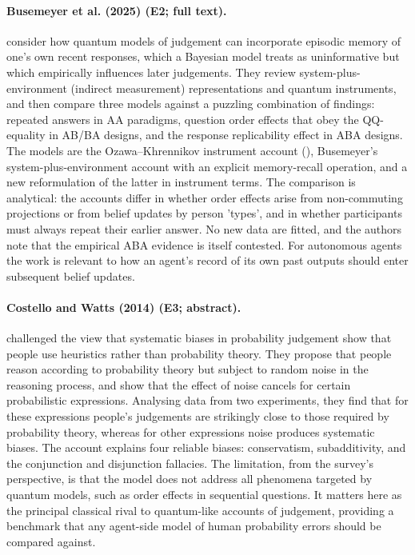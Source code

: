 \documentclass[10pt,a4paper]{article}
\begin{document}
\paragraph{Busemeyer et al. (2025) (E2; full text).} \citet{Busemeyer2025} consider how quantum models of judgement can incorporate episodic memory of one's own recent responses, which a Bayesian model treats as uninformative but which empirically influences later judgements. They review system-plus-environment (indirect measurement) representations and quantum instruments, and then compare three models against a puzzling combination of findings: repeated answers in AA paradigms, question order effects that obey the QQ-equality in AB/BA designs, and the response replicability effect in ABA designs. The models are the Ozawa--Khrennikov instrument account (\citep{Ozawa2021}), Busemeyer's system-plus-environment account with an explicit memory-recall operation, and a new reformulation of the latter in instrument terms. The comparison is analytical: the accounts differ in whether order effects arise from non-commuting projections or from belief updates by person 'types', and in whether participants must always repeat their earlier answer. No new data are fitted, and the authors note that the empirical ABA evidence is itself contested. For autonomous agents the work is relevant to how an agent's record of its own past outputs should enter subsequent belief updates.

\paragraph{Costello and Watts (2014) (E3; abstract).} \citet{Costello2014} challenged the view that systematic biases in probability judgement show that people use heuristics rather than probability theory. They propose that people reason according to probability theory but subject to random noise in the reasoning process, and show that the effect of noise cancels for certain probabilistic expressions. Analysing data from two experiments, they find that for these expressions people's judgements are strikingly close to those required by probability theory, whereas for other expressions noise produces systematic biases. The account explains four reliable biases: conservatism, subadditivity, and the conjunction and disjunction fallacies. The limitation, from the survey's perspective, is that the model does not address all phenomena targeted by quantum models, such as order effects in sequential questions. It matters here as the principal classical rival to quantum-like accounts of judgement, providing a benchmark that any agent-side model of human probability errors should be compared against.
\end{document}

